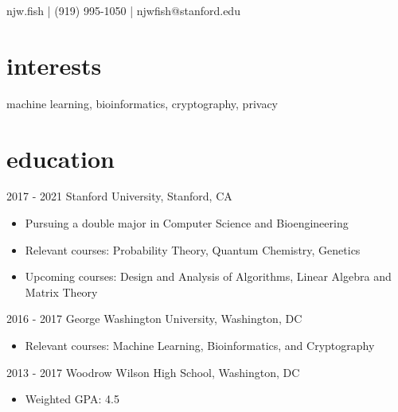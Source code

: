 \documentclass[]{friggeri-cv}
\begin{document}
\thispagestyle{empty}
       {njw.fish | (919) 995-1050 | njwfish@stanford.edu}

\vspace{1mm} 
\section{interests}
\vspace{-2mm} 
\hspace{3mm} machine learning, bioinformatics, cryptography, privacy

\vspace{2mm} 

\section{education}

\begin{entrylist}
  \entry
    {2017 - 2021}
    {Stanford University, Stanford, CA}
    {}
    {\vspace{-4mm} \begin{itemize}
	      \item Pursuing a double major in Computer Science and Bioengineering
	      \item Relevant courses: Probability Theory, Quantum Chemistry, Genetics
	      \item Upcoming courses: Design and Analysis of Algorithms, Linear Algebra and Matrix Theory
	 \end{itemize}}

  \entry
    {2016 - 2017}
    {George Washington University, Washington, DC}
    {}
    {\vspace{-4mm} \begin{itemize}
	      \item Relevant courses: Machine Learning, Bioinformatics, and Cryptography
     \end{itemize}}
    
  \entry
    {2013 - 2017}
    {Woodrow Wilson High School, Washington, DC}
    {}
    {\vspace{-4mm} \begin{itemize}
          \item Weighted GPA: 4.5
     \end{itemize}}

\end{entrylist}
\vspace{-1mm} 
\end{document}

